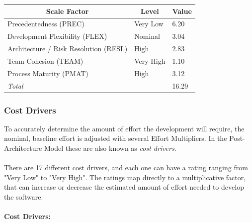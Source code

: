 \documentclass[english]{article}
\begin{document}
\begin{center}
	\begin{tabular}{|p{6cm}|p{2cm}|p{1cm}|}
		\hline
		\multicolumn{1}{|c|}{\textbf{Scale Factor}} & \multicolumn{1}{c|}{\textbf{Level}} & \multicolumn{1}{c|}{\textbf{Value}} \\
		\hline
		Precedentedness (PREC) & Very Low & 6.20 \\
		Development Flexibility (FLEX) & Nominal & 3.04 \\
		Architecture / Risk Resolution (RESL) & High & 2.83 \\
		Team Cohesion (TEAM) & Very High & 1.10 \\
		Process Maturity (PMAT) & High & 3.12 \\
		\hline
		\multicolumn{2}{|l|}{\textit{Total}} & 16.29 \\
		\hline
	\end{tabular}
\end{center}


\subsubsection{Cost Drivers}

To accurately determine the amount of effort the development will require, the nominal, baseline effort is adjusted with several Effort Multipliers. In the Post-Architecture Model these are also known as \textit{cost drivers}. 

\paragraph{}
There are 17 different cost drivers, and each one can have a rating ranging from "Very Low" to "Very High". The ratings map directly to a multiplicative factor, that can increase or decrease the estimated amount of effort needed to develop the software.


\paragraph{Cost Drivers:}
\end{document}
